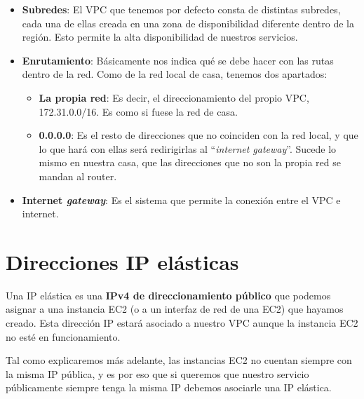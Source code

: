 \begin{itemize}
	\item \textbf{Subredes}: El VPC que tenemos por defecto consta de distintas subredes, cada una de ellas creada en una zona de disponibilidad diferente dentro de la región. Esto permite la alta disponibilidad de nuestros servicios.
	
	\item \textbf{Enrutamiento}: Básicamente nos indica qué se debe hacer con las rutas dentro de la red. Como de la red local de casa, tenemos dos apartados:
	\begin{itemize}
		\item \textbf{La propia red}: Es decir, el direccionamiento del propio VPC, 172.31.0.0/16. Es como si fuese la red de casa.
		
		\item \textbf{0.0.0.0}: Es el resto de direcciones que no coinciden con la red local, y que lo que hará con ellas será redirigirlas al “\textit{internet gateway}”. Sucede lo mismo en nuestra casa, que las direcciones que no son la propia red se mandan al router.
	\end{itemize}
	
	\item \textbf{Internet \textit{gateway}}: Es el sistema que permite la conexión entre el VPC e internet.
\end{itemize}



\section{Direcciones IP elásticas}

Una IP elástica es una \textbf{IPv4 de direccionamiento público} que podemos asignar a una instancia EC2 (o a un interfaz de red de una EC2) que hayamos creado. Esta dirección IP estará asociado a nuestro VPC aunque la instancia EC2 no esté en funcionamiento.


Tal como explicaremos más adelante, las instancias EC2 no cuentan siempre con la misma IP pública, y es por eso que si queremos que nuestro servicio públicamente siempre tenga la misma IP debemos asociarle una IP elástica.